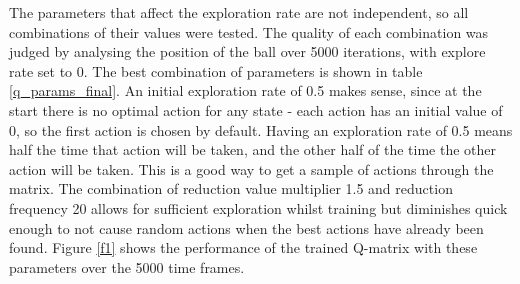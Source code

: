 \documentclass[12pt,a4paper]{article}
\begin{document}
The parameters that affect the exploration rate are not independent, so all combinations of their values were tested. The quality of each combination was judged by analysing the position of the ball over 5000 iterations, with explore rate set to 0. The best combination of parameters is shown in table \ref{q_params_final}. An initial exploration rate of 0.5 makes sense, since at the start there is no optimal action for any state - each action has an initial value of 0, so the first action is chosen by default. Having an exploration rate of 0.5 means half the time that action will be taken, and the other half of the time the other action will be taken. This is a good way to get a sample of actions through the matrix. The combination of reduction value multiplier 1.5 and reduction frequency 20 allows for sufficient exploration whilst training but diminishes quick enough to not cause random actions when the best actions have already been found. Figure \ref{f1} shows the performance of the trained Q-matrix with these parameters over the 5000 time frames.
\end{document}
